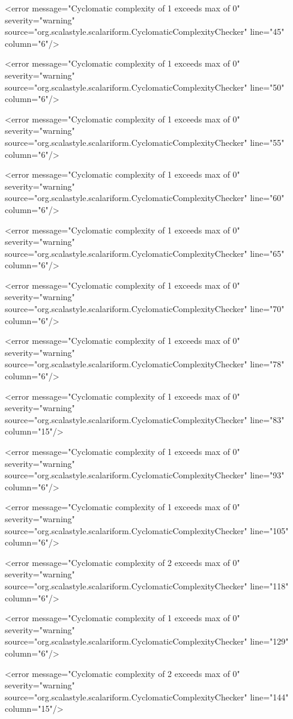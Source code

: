 \documentclass{scalatekids-article}
\begin{document}
<error message="Cyclomatic complexity of 1 exceeds max of 0" severity="warning" source="org.scalastyle.scalariform.CyclomaticComplexityChecker" line="45" column="6"/>

<error message="Cyclomatic complexity of 1 exceeds max of 0" severity="warning" source="org.scalastyle.scalariform.CyclomaticComplexityChecker" line="50" column="6"/>

<error message="Cyclomatic complexity of 1 exceeds max of 0" severity="warning" source="org.scalastyle.scalariform.CyclomaticComplexityChecker" line="55" column="6"/>

<error message="Cyclomatic complexity of 1 exceeds max of 0" severity="warning" source="org.scalastyle.scalariform.CyclomaticComplexityChecker" line="60" column="6"/>

<error message="Cyclomatic complexity of 1 exceeds max of 0" severity="warning" source="org.scalastyle.scalariform.CyclomaticComplexityChecker" line="65" column="6"/>

<error message="Cyclomatic complexity of 1 exceeds max of 0" severity="warning" source="org.scalastyle.scalariform.CyclomaticComplexityChecker" line="70" column="6"/>

<error message="Cyclomatic complexity of 1 exceeds max of 0" severity="warning" source="org.scalastyle.scalariform.CyclomaticComplexityChecker" line="78" column="6"/>

<error message="Cyclomatic complexity of 1 exceeds max of 0" severity="warning" source="org.scalastyle.scalariform.CyclomaticComplexityChecker" line="83" column="15"/>

<error message="Cyclomatic complexity of 1 exceeds max of 0" severity="warning" source="org.scalastyle.scalariform.CyclomaticComplexityChecker" line="93" column="6"/>

<error message="Cyclomatic complexity of 1 exceeds max of 0" severity="warning" source="org.scalastyle.scalariform.CyclomaticComplexityChecker" line="105" column="6"/>

<error message="Cyclomatic complexity of 2 exceeds max of 0" severity="warning" source="org.scalastyle.scalariform.CyclomaticComplexityChecker" line="118" column="6"/>

<error message="Cyclomatic complexity of 1 exceeds max of 0" severity="warning" source="org.scalastyle.scalariform.CyclomaticComplexityChecker" line="129" column="6"/>

<error message="Cyclomatic complexity of 2 exceeds max of 0" severity="warning" source="org.scalastyle.scalariform.CyclomaticComplexityChecker" line="144" column="15"/>
\end{document}

